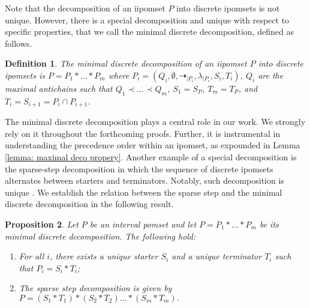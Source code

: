 \documentclass[11pt,a4paper,oldfontcommands]{memoir}
\newcommand*\intord{\dashrightarrow}
\newcommand*\rest[1]{{}_{| #1}}
\newtheorem{definition}{Definition}
\newtheorem{proposition}[definition]{Proposition}
\begin{document}
Note that the decomposition of an iipomset $P$ into discrete ipomsets is not unique. However, there is a special decomposition and unique with respect to specific properties, that we call the minimal discrete decomposition, defined as follows.

\begin{definition} \label{def: minimal discrete decomposition}
The minimal discrete decomposition of an iipomset $P$ into discrete ipomsets is $P=P_1* \dots * P_m$ where  $P_i=( Q_i, \emptyset, \intord\rest{P_i}, \lambda\rest{P_i}, S_i, T_i)$, $Q_i$ are the maximal antichains such that $Q_1 \prec \dots \prec Q_m$, $S_1= S_P$, $T_m= T_P$, and $T_i= S_{ i+ 1}= P_i\cap P_{ i+ 1}$.
\end{definition}
The minimal discrete decomposition plays a central role in our work. We strongly rely on it throughout the forthcoming proofs. Further, it is instrumental in understanding the precedence order within an ipomset, as expounded in Lemma \ref{lemma: maximal deco propery}. 
Another example of a special decomposition is the sparse-step decomposition in which the sequence of discrete ipomsets alternates between starters and terminators. Notably, such decomposition is unique \cite{MyhillNerode}. We establish the relation between the sparse step and the minimal discrete decomposition in the following result.
\begin{proposition}
     Let $P$ be an interval pomset and let $P=P_1* \dots * P_m$ be its minimal discrete decomposition. The following hold:
     \begin{enumerate}
         \item For all $i$, there exists a unique starter $S_i$ and a unique terminator $T_i$ such that $P_i=S_i*T_i$;
         \item The sparse step decomposition is given by $P=(S_1*T_1)*(S_2*T_2) \dots *(S_m*T_m).$
       \end{enumerate}
\end{proposition}
\end{document}
